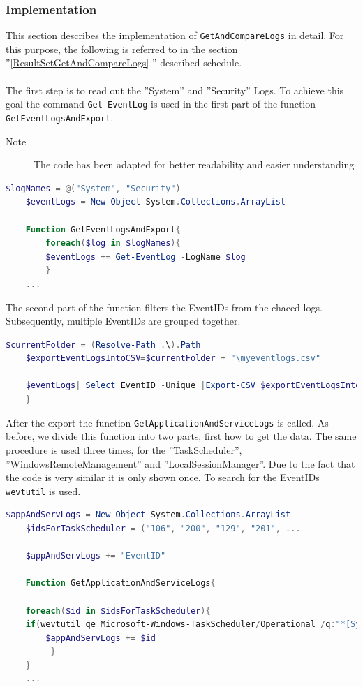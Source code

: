 \subsubsection{Implementation}
This section describes the implementation of \lstinline|GetAndCompareLogs| in detail. For this purpose, the following is referred to in the section ''\ref{ResultSetGetAndCompareLogs} '' described schedule.
\\\\
The first step is to read out the ''System'' and ''Security'' Logs. To achieve this goal the command \lstinline|Get-EventLog| is used in the first part of the function \lstinline|GetEventLogsAndExport|. \begin{description}
    \item[Note] The code has been adapted for better readability and easier understanding
    \end{description}
\begin{lstlisting}[caption=Function GetEventLogsAndExport Part 1, language=PowerShell]
    $logNames = @("System", "Security")
    $eventLogs = New-Object System.Collections.ArrayList

    Function GetEventLogsAndExport{
        foreach($log in $logNames){
        $eventLogs += Get-EventLog -LogName $log
        }
    ...
\end{lstlisting}
The second part of the function filters the EventIDs from the chaced logs. Subsequently, multiple EventIDs are grouped together.
\begin{lstlisting}[caption=Function GetEventLogsAndExport Part 2, language=PowerShell]
    $currentFolder = (Resolve-Path .\).Path
    $exportEventLogsIntoCSV=$currentFolder + "\myeventlogs.csv"

    $eventLogs| Select EventID -Unique |Export-CSV $exportEventLogsIntoCSV -NoTypeInfo -Encoding UTF8
    }
\end{lstlisting}
After the export the function \lstinline|GetApplicationAndServiceLogs| is called. As before, we divide this function into two parts, first how to get the data. The same procedure is used three times, for the ''TaskScheduler'', ''WindowsRemoteManagement'' and ''LocalSessionManager''. Due to the fact that the code is very similar it is only shown once. To search for the EventIDs  \lstinline|wevtutil| is used.
\begin{lstlisting}[caption=Function GetApplicationAndServiceLogs Part 1, language=PowerShell]
    $appAndServLogs = New-Object System.Collections.ArrayList
    $idsForTaskScheduler = ("106", "200", "129", "201", ...

    $appAndServLogs += "EventID"

    Function GetApplicationAndServiceLogs{
    
    foreach($id in $idsForTaskScheduler){
    if(wevtutil qe Microsoft-Windows-TaskScheduler/Operational /q:"*[System[(EventID="$id" )]]" /uni:false /f:text){
        $appAndServLogs += $id
         }
    }
    ...
\end{lstlisting}
